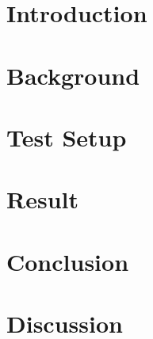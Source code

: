 \documentclass[Nomencl]{DylanMaster}
\begin{document}
\mytitlepage

\newpage

\tableofcontents

\newpage
\section{Introduction}


\newpage
\section{Background}


\newpage
\section{Test Setup}


\newpage
\section{Result}


\newpage
\section{Conclusion}


\newpage
\section{Discussion}


% 



\end{document}
